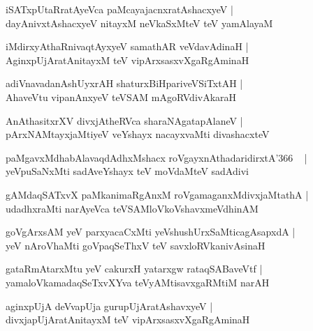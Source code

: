 \documentclass[twoside,12pt,openright]{book}
\newcounter{shloka}[chapter]
\begin{document}
\begin{shloka}
iSATxpUtaRratAyeVca paMcayajacnxratAshacxyeV |\\
dayAnivxtAshacxyeV nitayxM neVkaSxMteV teV yamAlayaM 
\end{shloka}

\begin{shloka}
iMdirxyAthaRnivaqtAyxyeV samathAR veVdavAdinaH |\\
AginxpUjAratAnitayxM teV vipArxsasxvXgaRgAminaH 
\end{shloka}

\begin{shloka}
adiVnavadanAshUyxrAH shaturxBiHpariveVSiTxtAH |\\
AhaveVtu vipanAnxyeV teVSAM mAgoRVdivAkaraH 
\end{shloka}

\begin{shloka}
AnAthasitxrXV divxjAtheRVca sharaNAgatapAlaneV |\\
pArxNAMtayxjaMtiyeV veYshayx nacayxvaMti divashacxteV 
\end{shloka}

\begin{shloka}
paMgavxMdhabAlavaqdAdhxMshacx roVgayxnAthadaridirxtA\char'366 ~ |\\
yeVpuSaNxMti sadAveYshayx teV moVdaMteV sadAdivi 
\end{shloka}

\begin{shloka}
gAMdaqSATxvX paMkanimaRgAnxM roVgamaganxMdivxjaMtathA |\\
udadhxraMti narAyeVca teVSAMloVkoVshavxmeVdhinAM 
\end{shloka}

\begin{shloka}
goVgArxsAM yeV parxyacaCxMti yeVshushUrxSaMticagAsapxdA |\\
yeV nAroVhaMti goVpaqSeThxV teV savxloRVkanivAsinaH 
\end{shloka}

\begin{shloka}
gataRmAtarxMtu yeV cakurxH yatarxgw rataqSABaveVtf |\\
yamaloVkamadaqSeTxvXYva teVyAMtisavxgaRMtiM narAH 
\end{shloka}

\begin{shloka}
aginxpUjA deVvapUja gurupUjAratAshavxyeV |\\
divxjapUjAratAnitayxM teV vipArxsasxvXgaRgAminaH 
\end{shloka}
\end{document}
